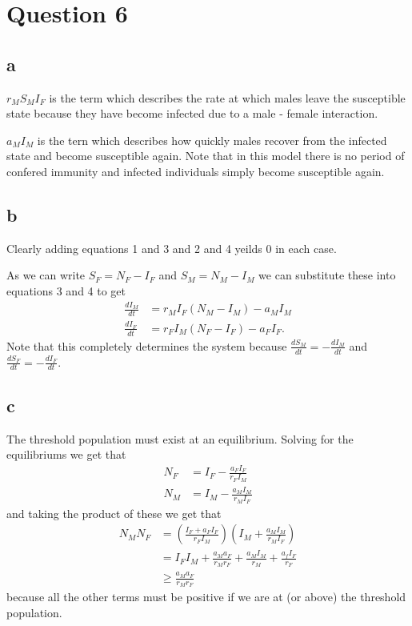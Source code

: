 \documentclass{unswmaths}
\begin{document}
\section*{Question 6}
\subsection*{a}
$ r_MS_MI_F $ is the term which describes the rate at which males leave the susceptible state because they have become infected due to a male - female interaction.

$ a_MI_M $ is the tern which describes how quickly males recover from the infected state and become susceptible again. Note that in this model there is no period of confered immunity and infected individuals simply become susceptible again.

\subsection*{b}
Clearly adding equations 1 and 3 and 2 and 4 yeilds 0 in each case. 

As we can write $ S_F = N_F - I_F $ and $ S_M = N_M - I_M $ we can substitute these into equations 3 and 4 to get
\begin{align*}
    \frac{dI_M}{dt} &= r_MI_F(N_M-I_M)-a_MI_M \\
    \frac{dI_F}{dt} &= r_FI_M(N_F - I_F) - a_FI_F.
\end{align*}
Note that this completely determines the system because $ \frac{dS_M}{dt} = -\frac{dI_M}{dt} $ and  $ \frac{dS_F}{dt} = -\frac{dI_F}{dt} $.
\subsection*{c}
The threshold population must exist at an equilibrium. Solving for the equilibriums we get that
\begin{align*}
    N_F &= I_F - \frac{a_FI_F}{r_FI_M} \\
    N_M &= I_M - \frac{a_MI_M}{r_MI_F}
\end{align*}
and taking the product of these we get that
\begin{align*}
    N_MN_F &= \left( \frac{I_F + a_FI_F}{r_FI_M} \right) \left( I_M + \frac{a_MI_M}{r_MI_F} \right) \\
        &= I_FI_M + \frac{a_Ma_F}{r_Mr_F} + \frac{a_MI_M}{r_M} + \frac{a_fI_F}{r_F} \\
        &\geq  \frac{a_Ma_F}{r_Mr_F} 
\end{align*}
because all the other terms must be positive if we are at (or above) the threshold population.
\begin{align*}
\end{align*}
\end{document}
